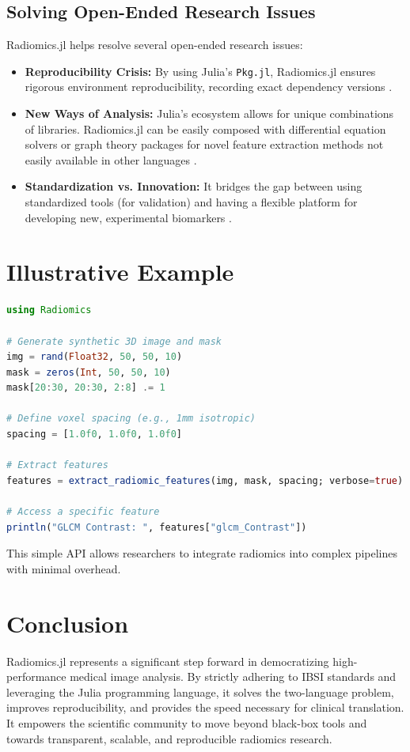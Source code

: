 \documentclass[preprint,12pt]{elsarticle}
\begin{document}
\subsection{Solving Open-Ended Research Issues}
Radiomics.jl helps resolve several open-ended research issues:
\begin{itemize}
    \item \textbf{Reproducibility Crisis:} By using Julia's \texttt{Pkg.jl}, Radiomics.jl ensures rigorous environment reproducibility, recording exact dependency versions \cite{ChuravyGodoy2022}.
    \item \textbf{New Ways of Analysis:} Julia's ecosystem allows for unique combinations of libraries. Radiomics.jl can be easily composed with differential equation solvers or graph theory packages for novel feature extraction methods not easily available in other languages \cite{RoeschGreener2023}.
    \item \textbf{Standardization vs. Innovation:} It bridges the gap between using standardized tools (for validation) and having a flexible platform for developing new, experimental biomarkers \cite{KnoppGrosser2021}.
\end{itemize}

\section{Illustrative Example}

\begin{lstlisting}[language=Julia, caption=Feature Extraction with Radiomics.jl]
using Radiomics

# Generate synthetic 3D image and mask
img = rand(Float32, 50, 50, 10)
mask = zeros(Int, 50, 50, 10)
mask[20:30, 20:30, 2:8] .= 1

# Define voxel spacing (e.g., 1mm isotropic)
spacing = [1.0f0, 1.0f0, 1.0f0]

# Extract features
features = extract_radiomic_features(img, mask, spacing; verbose=true)

# Access a specific feature
println("GLCM Contrast: ", features["glcm_Contrast"])
\end{lstlisting}

This simple API allows researchers to integrate radiomics into complex pipelines with minimal overhead.

\section{Conclusion}

Radiomics.jl represents a significant step forward in democratizing high-performance medical image analysis. By strictly adhering to IBSI standards and leveraging the Julia programming language, it solves the two-language problem, improves reproducibility, and provides the speed necessary for clinical translation. It empowers the scientific community to move beyond black-box tools and towards transparent, scalable, and reproducible radiomics research.



\end{document}
